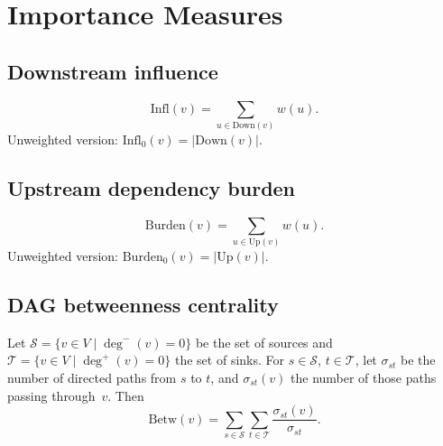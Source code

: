 \section{Importance Measures}

\subsection{Downstream influence}

\begin{definition}
\[
  \mathrm{Infl}(v) = \sum_{u \in \mathrm{Down}(v)} w(u).
\]
Unweighted version: $\mathrm{Infl}_0(v) = |\mathrm{Down}(v)|$.
\end{definition}

\subsection{Upstream dependency burden}

\begin{definition}
\[
  \mathrm{Burden}(v) = \sum_{u \in \mathrm{Up}(v)} w(u).
\]
Unweighted version: $\mathrm{Burden}_0(v) = |\mathrm{Up}(v)|$.
\end{definition}

\subsection{DAG betweenness centrality}

\begin{definition}
Let $\mathcal{S} = \{v \in V \mid \deg^-(v) = 0\}$ be the set of sources and
$\mathcal{T} = \{v \in V \mid \deg^+(v) = 0\}$ the set of sinks.
For $s \in \mathcal{S}$, $t \in \mathcal{T}$, let $\sigma_{st}$ be the number of directed paths from $s$ to $t$, and $\sigma_{st}(v)$ the number of those paths passing through~$v$. Then
\[
  \mathrm{Betw}(v) = \sum_{s \in \mathcal{S}} \sum_{t \in \mathcal{T}} \frac{\sigma_{st}(v)}{\sigma_{st}}.
\]
\end{definition}
